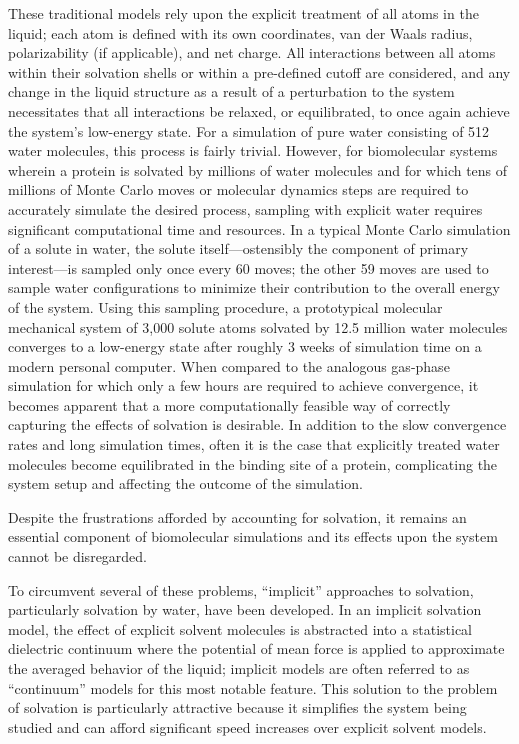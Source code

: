 \documentclass[12pt]{report}
\begin{document}
These traditional models rely upon the explicit treatment of all atoms in the liquid; each atom is defined with its own coordinates, van der Waals radius, polarizability (if applicable), and net charge. All interactions between all atoms within their solvation shells or within a pre-defined cutoff are considered, and any change in the liquid structure as a result of a perturbation to the system necessitates that all interactions be relaxed, or equilibrated, to once again achieve the system's low-energy state. For a simulation of pure water consisting of 512 water molecules, this process is fairly trivial. However, for biomolecular systems wherein a protein is solvated by millions of water molecules and for which tens of millions of Monte Carlo moves or molecular dynamics steps are required to accurately simulate the desired process, sampling with explicit water requires significant computational time and resources. In a typical Monte Carlo simulation of a solute in water, the solute itself---ostensibly the component of primary interest---is sampled only once every 60 moves; the other 59 moves are used to sample water configurations to minimize their contribution to the overall energy of the system. Using this sampling procedure, a prototypical molecular mechanical system of 3,000 solute atoms solvated by 12.5 million water molecules converges to a low-energy state after roughly 3 weeks of simulation time on a modern personal computer. When compared to the analogous gas-phase simulation for which only a few hours are required to achieve convergence, it becomes apparent that a more computationally feasible way of correctly capturing the effects of solvation is desirable. In addition to the slow convergence rates and long simulation times, often it is the case that explicitly treated water molecules become equilibrated in the binding site of a protein, complicating the system setup and affecting the outcome of the simulation.  \cite{michel1, michel2, luccarelli}

Despite the frustrations afforded by accounting for solvation, it remains an essential component of biomolecular simulations and its effects upon the system cannot be disregarded.
 
To circumvent several of these problems, ``implicit'' approaches to solvation, particularly solvation by water, have been developed. In an implicit solvation model, the effect of explicit solvent molecules is abstracted into a statistical dielectric continuum where the potential of mean force is applied to approximate the averaged behavior of the liquid; \cite{orozco} implicit models are often referred to as ``continuum'' models for this most notable feature. This solution to the problem of solvation is particularly attractive because it simplifies the system being studied and can afford significant speed increases over explicit solvent models.
\end{document}

